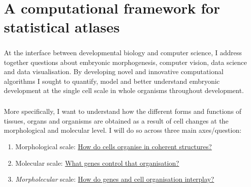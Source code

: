 \chapter{A computational framework for statistical atlases}
\chaptertoc{}
\paragraph{}At the interface between developmental biology and computer science, I address together questions about embryonic morphogenesis, computer vision, data science and data visualisation.
By developing novel and innovative computational algorithms I sought to quantify, model and better understand embryonic development at the single cell scale in whole organisms throughout development.

\paragraph{}More specifically, I want to understand how the different forms and functions of tissues, organs and organisms are obtained as a result of cell changes at the morphological and molecular level.
I will do so across three main axes/question:
\begin{enumerate}
	\item Morphological scale: \underline{How do cells organise in coherent structures?}
	\item Molecular scale: \underline{What genes control that organisation?}
	\item \emph{Morpholecular} scale: \underline{How do genes and cell organisation interplay?}
\end{enumerate}



